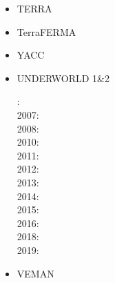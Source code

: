 \begin{itemize}
\item TERRA
\cite{burb97}
\cite{burl98}
\cite{phbs09}
\cite{wodd09}
\cite{woda11}
\cite{dadb13}
\cite{vade16}

\item TerraFERMA
\cite{wisv14}
\cite{wisv17}
\cite{spmw16}
\cite{ceww17}
\cite{ceww19}


\item YACC
\cite{tosn15}
\cite{tomy16}

\item UNDERWORLD 1\&2

: \cite{stfs06}\\
2007: \cite{moql07}\cite{stfs07}\\
2008: \cite{lemm08}\cite{ozrs08}\\
2010: \cite{casm10}\cite{mamb10}\cite{stsf10}\cite{stfc10}\cite{fasm10}\\
2011: \cite{memm11}\cite{cafz11}\\
2012: \cite{cafa12}\\
2013: \cite{bemm13}\cite{scmo13}\cite{faca13}\cite{care13}\\
2014: \cite{famc14}\\
2015: \cite{quxm15}\cite{bemm15}\cite{scsp15}\cite{shmj15}\\
2016: \cite{shmv16}\cite{onlw16}\cite{kicf16}\\
2018: \cite{memm18}\\
2019: \cite{samo19}\cite{yamg19}

\item VEMAN
\cite{bepo10}


\end{itemize}
